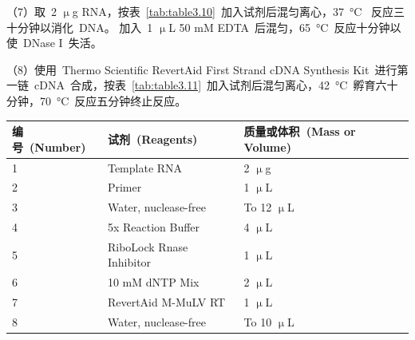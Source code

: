 （7）取\ 2 $\upmu$g RNA，按表\ \ref{tab:table3.10}\ 加入试剂后混匀离心，\SI{37}{\degreeCelsius} \ 反应三十分钟以消化\ DNA。 加入\ 1 $\upmu$L 50 mM EDTA\ 后混匀，\SI{65}{\degreeCelsius}\ 反应十分钟以使\ DNase I\ 失活。

（8）使用\ Thermo Scientific RevertAid First Strand cDNA Synthesis Kit\ 进行第一链\ cDNA\ 合成，按表\ \ref{tab:table3.11}\ 加入试剂后混匀离心，\SI{42}{\degreeCelsius}\ 孵育六十
分钟，\SI{70}{\degreeCelsius}\ 反应五分钟终止反应。
\begin{table}[!ht]
\centering
{
\par}
\small
\begin{tabular*}{\textwidth}[c]{@{\extracolsep{\fill}}lll}
\toprule
编号\ (Number) & 试剂\ (Reagents) & 质量或体积\ (Mass or Volume)\\
\midrule
1 & Template RNA & 2 $\upmu$g\\
2 & Primer & 1 $\upmu$L\\
3 & Water, nuclease-free & To 12 $\upmu$L\\
4 & 5x Reaction Buffer & 4 $\upmu$L\\
5 & RiboLock Rnase Inhibitor & 1 $\upmu$L\\
6 & 10 mM dNTP Mix & 2 $\upmu$L\\
7 & RevertAid M-MuLV RT & 1 $\upmu$L\\
8 & Water, nuclease-free & To 10 $\upmu$L\\

\bottomrule
\end{tabular*}
\end{table}

